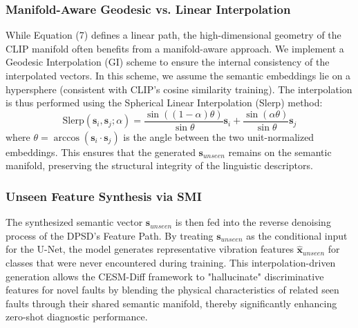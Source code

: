 \subsubsection{Manifold-Aware Geodesic vs. Linear Interpolation}
While Equation (7) defines a linear path, the high-dimensional geometry of the CLIP manifold often benefits from a manifold-aware approach. We implement a Geodesic Interpolation (GI) scheme to ensure the internal consistency of the interpolated vectors. In this scheme, we assume the semantic embeddings lie on a hypersphere (consistent with CLIP's cosine similarity training). The interpolation is thus performed using the Spherical Linear Interpolation (Slerp) method:
\begin{equation}
\text{Slerp}(\mathbf{s}_i, \mathbf{s}_j; \alpha) = \frac{\sin((1-\alpha)\theta)}{\sin \theta} \mathbf{s}_i + \frac{\sin(\alpha \theta)}{\sin \theta} \mathbf{s}_j
\end{equation}
where $\theta = \arccos(\mathbf{s}_i \cdot \mathbf{s}_j)$ is the angle between the two unit-normalized embeddings. This ensures that the generated $\mathbf{s}_{unseen}$ remains on the semantic manifold, preserving the structural integrity of the linguistic descriptors.

\subsubsection{Unseen Feature Synthesis via SMI}
The synthesized semantic vector $\mathbf{s}_{unseen}$ is then fed into the reverse denoising process of the DPSD's Feature Path. By treating $\mathbf{s}_{unseen}$ as the conditional input for the U-Net, the model generates representative vibration features $\hat{\mathbf{x}}_{unseen}$ for classes that were never encountered during training. This interpolation-driven generation allows the CESM-Diff framework to "hallucinate" discriminative features for novel faults by blending the physical characteristics of related seen faults through their shared semantic manifold, thereby significantly enhancing zero-shot diagnostic performance.
